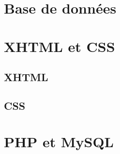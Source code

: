\documentclass[12pt,a4paper,openany]{book}
\begin{document}
	\setcounter{tocdepth}{2}
	\setcounter{secnumdepth}{3}
	\maketitle
	\tableofcontents
	\part{Base de données}
	
	
	\part{XHTML et CSS}
	\chapter{XHTML}
	
	
	
	\chapter{CSS}
	\part{PHP et MySQL}
\end{document}
